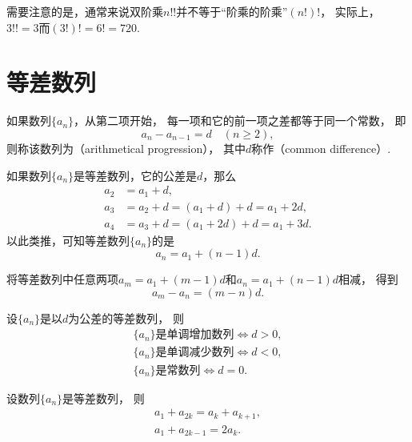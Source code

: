 需要注意的是，通常来说双阶乘\(n!!\)并不等于“阶乘的阶乘”\((n!)!\)，
实际上，\(3!! = 3\)而\((3!)! = 6! = 720\).

\section{等差数列}
\begin{definition}
如果数列\(\{a_n\}\)，从第二项开始，
每一项和它的前一项之差都等于同一个常数，
即\begin{equation*}
	a_n - a_{n-1} = d
	\quad(n \geq 2),
\end{equation*}
则称该数列为（arithmetical progression），
其中\(d\)称作（common difference）.
\end{definition}

如果数列\(\{a_n\}\)是等差数列，它的公差是\(d\)，那么\begin{align*}
    a_2 &= a_1 + d, \\
    a_3 &= a_2 + d = (a_1 + d) + d = a_1 + 2d, \\
    a_4 &= a_3 + d = (a_1 + 2d) + d = a_1 + 3d.
\end{align*}
以此类推，可知等差数列\(\{a_n\}\)的是\begin{equation}
    a_n = a_1 + (n-1) d.
\end{equation}

将等差数列中任意两项\(a_m = a_1 + (m-1) d\)和\(a_n = a_1 + (n-1) d\)相减，
得到\begin{equation*}
    a_m - a_n = (m-n) d.
\end{equation*}

\begin{theorem}
设\(\{a_n\}\)是以\(d\)为公差的等差数列，
则\begin{gather*}
	\text{$\{a_n\}$是单调增加数列}
	\iff
	d > 0, \\
	\text{$\{a_n\}$是单调减少数列}
	\iff
	d < 0, \\
	\text{$\{a_n\}$是常数列}
	\iff
	d = 0.
\end{gather*}
\end{theorem}

\begin{property}
设数列\(\{a_n\}\)是等差数列，
则\begin{gather}
	a_1 + a_{2k} = a_k + a_{k+1}, \\
	a_1 + a_{2k-1} = 2 a_k.
\end{gather}
\end{property}

